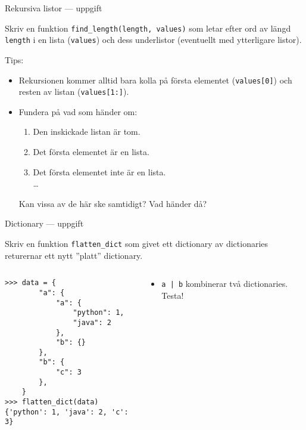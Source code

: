 \documentclass{beamer}
\begin{document}

  \begin{frame}[fragile]{Rekursiva listor --- uppgift}

    Skriv en funktion \texttt{find\_length(length, values)} som letar efter ord
      av längd \texttt{length} i en lista (\texttt{values}) och dess underlistor
      (eventuellt med ytterligare listor).

    Tips:

    \vspace{-1em}

    \begin{itemize}

      \item Rekursionen kommer alltid bara kolla på första elementet
      (\texttt{values[0]}) och resten av listan (\texttt{values[1:]}).

      \item Fundera på vad som händer om:

      \begin{enumerate}
        \item Den inskickade listan är tom.
        \item Det första elementet är en lista.
        \item Det första elementet inte är en lista. \\
        \dots{}
      \end{enumerate}

      Kan vissa av de här ske samtidigt? Vad händer då?

    \end{itemize}

  \end{frame}

  \begin{frame}[fragile]{Dictionary --- uppgift}

    Skriv en funktion \texttt{flatten\_dict} som givet ett dictionary av
    dictionaries returernar ett nytt ''platt'' dictionary.

    \begin{columns}
      \begin{column}{0.48\textwidth}
        \begin{verbatim}
>>> data = {
        "a": {
            "a": {
                "python": 1,
                "java": 2
            },
            "b": {}
        },
        "b": {
            "c": 3
        },
    }
>>> flatten_dict(data)
{'python': 1, 'java': 2, 'c': 3}
        \end{verbatim}
      \end{column}
      \begin{column}{0.48\textwidth}

        \begin{itemize}
          \item \texttt{a | b} kombinerar två dictionaries. Testa!
        \end{itemize}

      \end{column}
    \end{columns}

  \end{frame}
\end{document}
